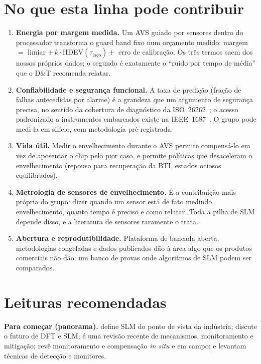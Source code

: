 \documentclass[11pt,a4paper]{article}
\begin{document}
\section{No que esta linha pode contribuir}\label{sec:contrib}

\begin{enumerate}
  \item \textbf{Energia por margem medida.} Um AVS guiado por sensores dentro do processador transforma o guard band fixo
        num orçamento medido: margem $=$ limiar $+\,k\cdot$HDEV$(\tau_{\text{laço}})+$ erro de calibração. Os três termos
        saem dos nossos próprios dados; o segundo é exatamente o ``ruído por tempo de média'' que o D\&T recomenda relatar.
  \item \textbf{Confiabilidade e segurança funcional.} A taxa de predição (fração de falhas antecedidas por alarme) é a
        grandeza que um argumento de segurança precisa, no sentido da cobertura de diagnóstico da ISO~26262~\cite{iso26262}; o
        acesso padronizado a instrumentos embarcados existe na IEEE~1687~\cite{ieee1687}. O grupo pode medi-la em silício,
        com metodologia pré-registrada.
  \item \textbf{Vida útil.} Medir o envelhecimento durante o AVS permite compensá-lo em vez de aposentar o chip pelo pior
        caso, e permite políticas que desaceleram o envelhecimento (repouso para recuperação da BTI, estados ociosos
        equilibrados).
  \item \textbf{Metrologia de sensores de envelhecimento.} É a contribuição mais própria do grupo: dizer quando um sensor
        está de fato medindo envelhecimento, quanto tempo é preciso e como relatar. Toda a pilha de SLM depende disso, e a
        literatura de sensores raramente o trata.
  \item \textbf{Abertura e reprodutibilidade.} Plataforma de bancada aberta, metodologias congeladas e dados publicados
        dão à área algo que os produtos comerciais não dão: um banco de provas onde algoritmos de SLM podem ser comparados.
\end{enumerate}

\section{Leituras recomendadas}

\textbf{Para começar (panorama).} \cite{kashyap2021slm} define SLM do ponto de vista da indústria; \cite{tahoori2024future}
discute o futuro de DFT e SLM; \cite{babu2025extending} é uma revisão recente de mecanismos, monitoramento e mitigação;
\cite{seok2018recent} revê monitoramento e compensação \emph{in situ} e em campo; \cite{lanzieri2024review} e
\cite{juracy2020survey} levantam técnicas de detecção e monitores.
\end{document}
